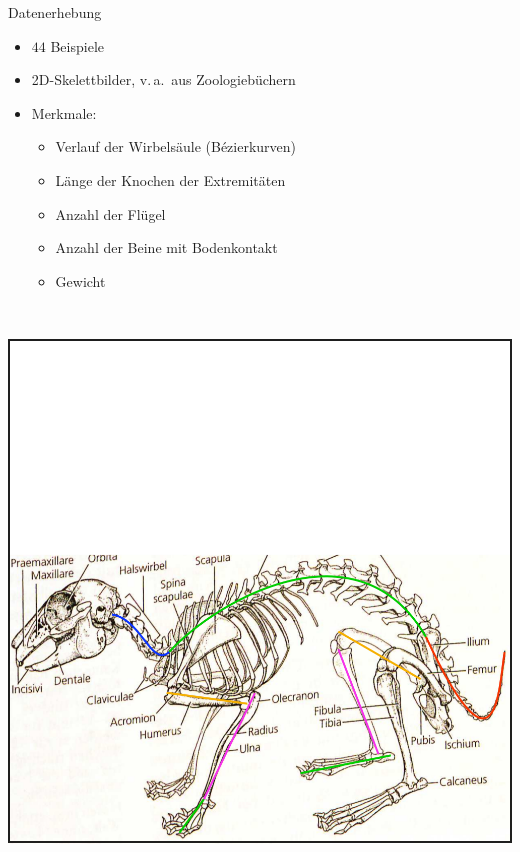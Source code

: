 \documentclass{beamer}
\newcommand{\va}{v.\,a.\ }
\begin{document}
\begin{frame}{Datenerhebung}
 \begin{minipage}{0.5\textwidth}
  \begin{itemize}
   \item $44$ Beispiele
   \item 2D-Skelettbilder, \va aus Zoologiebüchern
   \item Merkmale: 
   \begin{itemize}
    \item Verlauf der Wirbelsäule (Bézierkurven)
    \item Länge der Knochen der Extremitäten
    \item Anzahl der Flügel
    \item Anzahl der Beine mit Bodenkontakt
    \item Gewicht
   \end{itemize}
  \end{itemize}
 \end{minipage}~
 \begin{minipage}{0.5\textwidth}
  \includegraphics[width=\textwidth]{../../PCA/Skelettbilder/Kaninchen_farbig.png}
 \end{minipage}
\end{frame}
\end{document}
